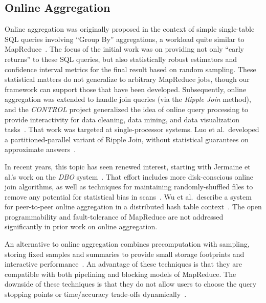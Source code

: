\subsection{Online Aggregation}
Online aggregation was originally proposed in the context of simple single-table
SQL queries involving ``Group By'' aggregations, a workload quite similar to
MapReduce~\cite{onlineagg}.  The focus of the initial work was on providing not
only ``early returns'' to these SQL queries, but also statistically robust
estimators and confidence interval metrics for the final result based on random
sampling.  These statistical matters do not generalize to arbitrary MapReduce
jobs, though our framework can support those that have been developed.
Subsequently, online aggregation was extended to handle join queries (via the
\emph{Ripple Join} method), and the \emph{CONTROL} project generalized the idea
of online query processing to provide interactivity for data cleaning, data
mining, and data visualization tasks~\cite{ieeecontrol}.  That work was targeted
at single-processor systems.  Luo et al.\ developed a partitioned-parallel
variant of Ripple Join, without statistical guarantees on approximate
answers~\cite{luo-ripple}.

In recent years, this topic has seen renewed interest, starting with Jermaine et
al.'s work on the \emph{DBO} system~\cite{dbo}.  That effort includes more
disk-conscious online join algorithms, as well as techniques for maintaining
randomly-shuffled files to remove any potential for statistical bias in
scans~\cite{jermaine-shuffle}.  Wu et al.\ describe a system for peer-to-peer
online aggregation in a distributed hash table context~\cite{wu-vldb09}.  The
open programmability and fault-tolerance of MapReduce are not addressed
significantly in prior work on online aggregation.

An alternative to online aggregation combines precomputation with sampling,
storing fixed samples and summaries to provide small storage footprints and
interactive performance~\cite{gibbons98new}. An advantage of these techniques is
that they are compatible with both pipelining and blocking models of
MapReduce. The downside of these techniques is that they do not allow users to
choose the query stopping points or time/accuracy trade-offs
dynamically~\cite{ieeecontrol}.



